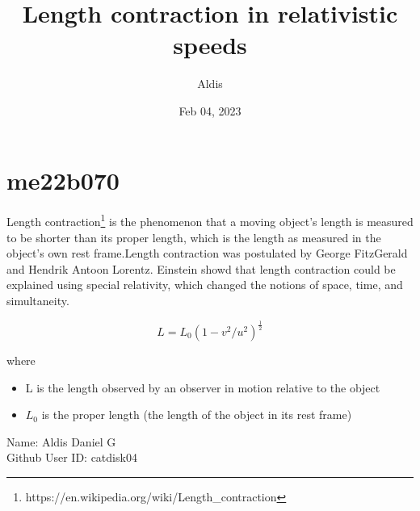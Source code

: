 \documentclass[12pt, a4paper]{article}
\author{Aldis}
\title{Length contraction in relativistic speeds}
\date{Feb 04, 2023}
\begin{document}
\maketitle
\section{me22b070}

Length contraction\footnote{https://en.wikipedia.org/wiki/Length\_contraction}
is the phenomenon that a moving object's length is measured to be shorter than its proper length, which is 
the length as measured in the object's own rest frame.Length contraction was postulated by George FitzGerald
and Hendrik Antoon Lorentz. Einstein showd that length contraction could be explained using special 
relativity, which changed the notions of space, time, and simultaneity.

\begin{equation}
	L=L_0(1-v^2/u^2)^\frac{1}{2}
\end{equation}

where 
\begin{itemize}
	\item L is the length observed by an observer in motion relative to the object
	\item $L_0$ is the proper length (the length of the object in its rest frame)
\end{itemize}

\begin{flushleft}
Name: Aldis Daniel G\\
Github User ID: catdisk04
\end{flushleft}
\end{document}
